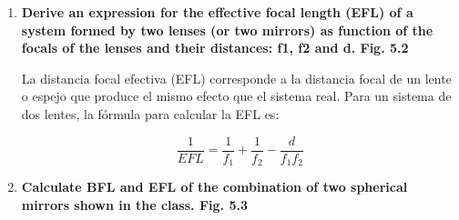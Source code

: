 \documentclass[11pt]{article}
\begin{document}
\begin{enumerate}
Resolviendo esta multiplicación se tiene:

\[
\begin{bmatrix}-\frac{f_2}{f_1} & f_1 + f_2 \\
0 & -\frac{f_1}{f_2}\end{bmatrix}
\]

Asumiendo que \(\theta = 0\), la magnificación angular es:

\[M = -\frac{f_1}{f_2}\]


    \item \textbf{Derive an expression for the effective focal length (EFL) of a system formed by two lenses (or two mirrors) as function of the focals of the lenses and their distances: f1, f2 and d. Fig. 5.2}
    
La distancia focal efectiva (EFL) corresponde a la distancia focal de un lente o espejo que produce el mismo efecto que el sistema real. Para un sistema de dos lentes, la fórmula para calcular la EFL es:

\[\frac{1}{EFL} = \frac{1}{f_1} + \frac{1}{f_2} - \frac{d}{f_1 f_2}\]

    \item \textbf{Calculate BFL and EFL of the combination of two spherical mirrors shown in the class. Fig. 5.3}


\end{enumerate}
\end{document}
